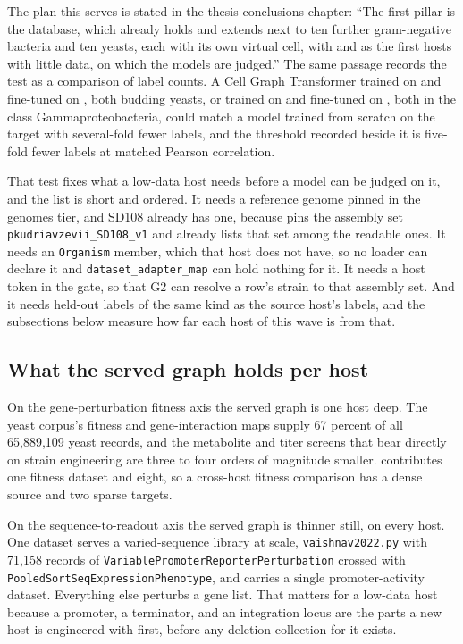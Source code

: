 The plan this serves is stated in the thesis conclusions chapter: ``The first pillar is the
database, which already holds  and extends next to ten further
gram-negative bacteria and ten yeasts, each with its own virtual cell, with  and  as the first hosts with little data, on which the models
are judged.'' The same passage records the test as a comparison of label counts. A Cell Graph
Transformer trained on
 and fine-tuned on , both budding yeasts, or trained
on  and fine-tuned on , both in the class Gammaproteobacteria,
could match a model trained from scratch on the target with several-fold fewer labels, and the
threshold recorded beside it is five-fold fewer labels at matched Pearson correlation.

That test fixes what a low-data host needs before a model can be judged on it, and the list is
short and ordered. It needs a reference genome pinned in the genomes tier, and
 SD108 already has one, because
 pins the assembly set
\texttt{pkudriavzevii\_SD108\_v1} and  already lists that
set among the readable ones. It needs an \texttt{Organism} member, which that host
does not have, so no loader can declare it and \texttt{dataset\_adapter\_map} can hold nothing
for it. It needs a host token in the gate, so that G2 can resolve a row's strain to that
assembly set. And it needs held-out labels of the same kind as the source host's labels, and
the subsections below measure how far each host of this wave is from that.

\subsection{What the served graph holds per host}\label{sec:state-served}

On the gene-perturbation fitness axis the served graph is one host deep. The yeast corpus's
fitness and gene-interaction maps supply 67 percent of all 65,889,109 yeast records, and the
metabolite and titer screens that bear directly on strain engineering are three to four orders
of magnitude smaller.  contributes one fitness dataset and  eight,
so a cross-host fitness comparison has a dense source and two sparse targets.

On the sequence-to-readout axis the served graph is thinner still, on every host. One dataset
serves a varied-sequence library at scale, \texttt{vaishnav2022.py} with 71,158 records of
\texttt{VariablePromoterReporterPerturbation} crossed with
\texttt{PooledSortSeqExpressionPhenotype}, and  carries a single promoter-activity
dataset. Everything else perturbs a gene list. That matters for a low-data host because a
promoter, a terminator, and an integration locus are the parts a new host is engineered with
first, before any deletion collection for it exists.

